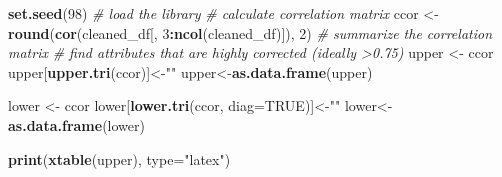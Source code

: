 \documentclass[]{article}
\newenvironment{Shaded}{\begin{snugshade}}{\end{snugshade}}
\newcommand{\CommentTok}[1]{\textcolor[rgb]{0.56,0.35,0.01}{\textit{#1}}}
\newcommand{\DataTypeTok}[1]{\textcolor[rgb]{0.13,0.29,0.53}{#1}}
\newcommand{\DecValTok}[1]{\textcolor[rgb]{0.00,0.00,0.81}{#1}}
\newcommand{\KeywordTok}[1]{\textcolor[rgb]{0.13,0.29,0.53}{\textbf{#1}}}
\newcommand{\NormalTok}[1]{#1}
\newcommand{\OperatorTok}[1]{\textcolor[rgb]{0.81,0.36,0.00}{\textbf{#1}}}
\newcommand{\OtherTok}[1]{\textcolor[rgb]{0.56,0.35,0.01}{#1}}
\newcommand{\StringTok}[1]{\textcolor[rgb]{0.31,0.60,0.02}{#1}}
\begin{document}
\begin{Shaded}
\begin{Highlighting}[]
\KeywordTok{set.seed}\NormalTok{(}\DecValTok{98}\NormalTok{)}
\CommentTok{# load the library}
\CommentTok{# calculate correlation matrix}
\NormalTok{ccor <-}\StringTok{ }\KeywordTok{round}\NormalTok{(}\KeywordTok{cor}\NormalTok{(cleaned_df[, }\DecValTok{3}\OperatorTok{:}\KeywordTok{ncol}\NormalTok{(cleaned_df)]), }\DecValTok{2}\NormalTok{)}
\CommentTok{# summarize the correlation matrix}
\CommentTok{# find attributes that are highly corrected (ideally >0.75)}
\NormalTok{upper <-}\StringTok{ }\NormalTok{ccor}
\NormalTok{upper[}\KeywordTok{upper.tri}\NormalTok{(ccor)]<-}\StringTok{""}
\NormalTok{upper<-}\KeywordTok{as.data.frame}\NormalTok{(upper)}

\NormalTok{lower <-}\StringTok{ }\NormalTok{ccor}
\NormalTok{lower[}\KeywordTok{lower.tri}\NormalTok{(ccor, }\DataTypeTok{diag=}\OtherTok{TRUE}\NormalTok{)]<-}\StringTok{""}
\NormalTok{lower<-}\KeywordTok{as.data.frame}\NormalTok{(lower)}

\KeywordTok{print}\NormalTok{(}\KeywordTok{xtable}\NormalTok{(upper), }\DataTypeTok{type=}\StringTok{"latex"}\NormalTok{)}
\end{Highlighting}
\end{Shaded}
\end{document}
